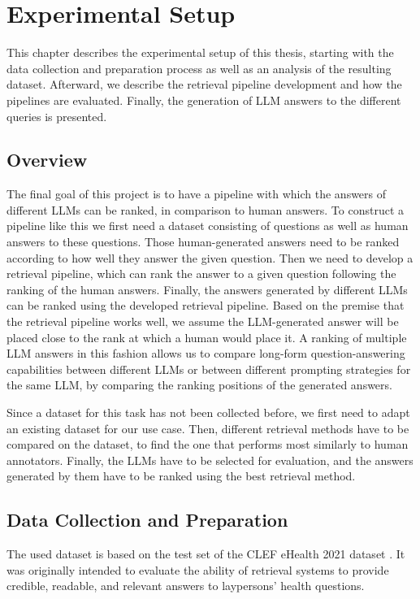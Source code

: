 \chapter{Experimental Setup}\label{experimental-setup}
This chapter describes the experimental setup of this thesis, starting with the data collection and preparation process as well as an analysis of the resulting dataset.
Afterward, we describe the retrieval pipeline development and how the pipelines are evaluated.
Finally, the generation of LLM answers to the different queries is presented.

\section{Overview}\label{sec:overview}
The final goal of this project is to have a pipeline with which the answers of different LLMs can be ranked, in comparison to human answers.
To construct a pipeline like this we first need a dataset consisting of questions as well as human answers to these questions.
Those human-generated answers need to be ranked according to how well they answer the given question.
Then we need to develop a retrieval pipeline, which can rank the answer to a given question following the ranking of the human answers.
Finally, the answers generated by different LLMs can be ranked using the developed retrieval pipeline.
Based on the premise that the retrieval pipeline works well, we assume the LLM-generated answer will be placed close to the rank at which a human would place it.
A ranking of multiple LLM answers in this fashion allows us to compare long-form question-answering capabilities between different LLMs or between different prompting strategies for the same LLM, by comparing the ranking positions of the generated answers.

Since a dataset for this task has not been collected before, we first need to adapt an existing dataset for our use case.
Then, different retrieval methods have to be compared on the dataset, to find the one that performs most similarly to human annotators.
Finally, the LLMs have to be selected for evaluation, and the answers generated by them have to be ranked using the best retrieval method.

\section{Data Collection and Preparation}\label{sec:dataset}
The used dataset is based on the test set of the CLEF eHealth 2021 dataset \cite{goeuriot:2021:Consumer}.
It was originally intended to evaluate the ability of retrieval systems to provide credible, readable, and relevant answers to laypersons' health questions.

